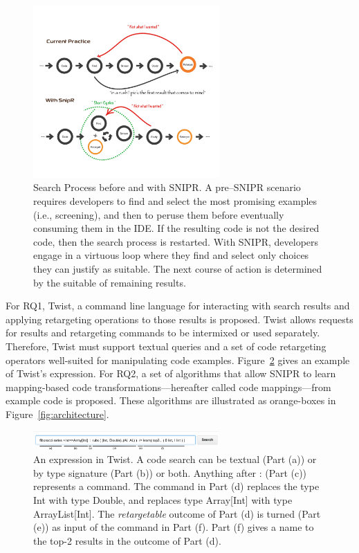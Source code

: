 \documentclass[conference]{IEEEtran}
\begin{document}
\begin{figure}[!t]
    \centering
    \includegraphics[width=2.8in]{images/searchprocess}
    \caption{Search Process before and with \uppercase{SnipR}. A pre--\uppercase{SnipR} scenario requires developers to find and select the most promising examples (i.e., screening), and then to peruse them before eventually consuming them in the IDE. If the resulting code is not the desired code, then the search process is restarted. With \uppercase{SnipR}, developers engage in a virtuous loop where they find and select only choices they can justify as suitable. The next course of action is determined by the suitable of remaining results.}
    \label{fig:retargeting}
\end{figure}
For RQ1, Twist, a command line language for interacting with search results and applying retargeting operations to those results is proposed. Twist allows requests for results and retargeting commands to be intermixed or used separately. Therefore, Twist must support textual queries and a set of code retargeting operators well-suited for manipulating code examples. Figure~\ref{fig:twistcmd} gives an example of Twist's expression. For RQ2, a set of algorithms that allow \uppercase{SNIPR} to learn mapping-based code transformations---hereafter called code mappings---from example code is proposed. These algorithms are illustrated as orange-boxes in Figure~\ref{fig:architecture}.  

 \begin{figure}[!t]
    \centering
    \includegraphics[width=2.8in]{images/twistcmd}
    \caption{An expression in Twist. A code search can be textual (Part (a)) or by type signature (Part (b)) or both. Anything after : (Part (c)) represents a command. The command in Part (d) replaces the type Int with type Double, and replaces type Array[Int] with type ArrayList[Int]. The \emph{retargetable} outcome of Part (d) is turned (Part (e)) as input of the command in Part (f). Part (f) gives a name to the top-2 results in the outcome of Part (d).}
    \label{fig:twistcmd}
\end{figure}
\end{document}
